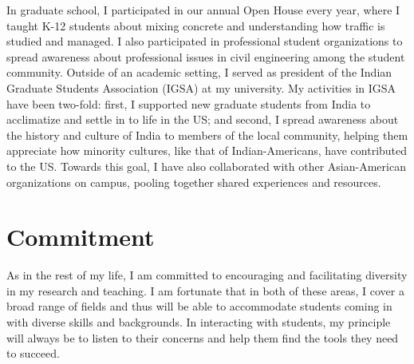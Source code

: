 \documentclass[12pt]{article}
\begin{document}
In graduate school, I participated in our annual Open House every year, where I taught K-12 students about mixing concrete and understanding how traffic is studied and managed. I also participated in professional student organizations to spread awareness about professional issues in civil engineering among the student community. Outside of an academic setting, I served as president of the Indian Graduate Students Association (IGSA) at my university. My activities in IGSA have been two-fold: first, I supported new graduate students from India to acclimatize and settle in to life in the US; and second, I spread awareness about the history and culture of India to members of the local community, helping them appreciate how minority cultures, like that of Indian-Americans, have contributed to the US. Towards this goal, I have also collaborated with other Asian-American organizations on campus, pooling together shared experiences and resources. 

\section*{Commitment}
As in the rest of my life, I am committed to encouraging and facilitating diversity in my research and teaching. I am fortunate that in both of these areas, I cover a broad range of fields and thus will be able to accommodate students coming in with diverse skills and backgrounds. In interacting with students, my principle will always be to listen to their concerns and help them find the tools they need to succeed.
\end{document}
